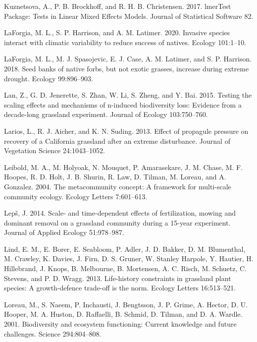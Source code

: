 \documentclass[twoside,12pt,final]{ucthesis-CA2012}
\newlength{\cslhangindent}
\newenvironment{cslreferences}%
  {\setlength{\parindent}{0pt}%
  \everypar{\setlength{\hangindent}{\cslhangindent}}\ignorespaces}%
  {\par}
\begin{document}
\begin{ucmainmatter}
\begin{cslreferences}
\leavevmode\hypertarget{ref-Kuznetsova2017}{}%
Kuznetsova, A., P. B. Brockhoff, and R. H. B. Christensen. 2017. lmerTest Package: Tests in Linear Mixed Effects Models. Journal of Statistical Software 82.

\leavevmode\hypertarget{ref-Laforgia2020}{}%
LaForgia, M. L., S. P. Harrison, and A. M. Latimer. 2020. Invasive species interact with climatic variability to reduce success of natives. Ecology 101:1--10.

\leavevmode\hypertarget{ref-Laforgia2018}{}%
LaForgia, M. L., M. J. Spasojevic, E. J. Case, A. M. Latimer, and S. P. Harrison. 2018. Seed banks of native forbs, but not exotic grasses, increase during extreme drought. Ecology 99:896--903.

\leavevmode\hypertarget{ref-lan2015}{}%
Lan, Z., G. D. Jenerette, S. Zhan, W. Li, S. Zheng, and Y. Bai. 2015. Testing the scaling effects and mechanisms of n-induced biodiversity loss: Evidence from a decade-long grassland experiment. Journal of Ecology 103:750--760.

\leavevmode\hypertarget{ref-Larios2013}{}%
Larios, L., R. J. Aicher, and K. N. Suding. 2013. Effect of propagule pressure on recovery of a California grassland after an extreme disturbance. Journal of Vegetation Science 24:1043--1052.

\leavevmode\hypertarget{ref-leibold2004}{}%
Leibold, M. A., M. Holyoak, N. Mouquet, P. Amarasekare, J. M. Chase, M. F. Hoopes, R. D. Holt, J. B. Shurin, R. Law, D. Tilman, M. Loreau, and A. Gonzalez. 2004. The metacommunity concept: A framework for multi-scale community ecology. Ecology Letters 7:601--613.

\leavevmode\hypertarget{ref-lep2014}{}%
Lepš, J. 2014. Scale- and time-dependent effects of fertilization, mowing and dominant removal on a grassland community during a 15-year experiment. Journal of Applied Ecology 51:978--987.

\leavevmode\hypertarget{ref-Lind2013}{}%
Lind, E. M., E. Borer, E. Seabloom, P. Adler, J. D. Bakker, D. M. Blumenthal, M. Crawley, K. Davies, J. Firn, D. S. Gruner, W. Stanley Harpole, Y. Hautier, H. Hillebrand, J. Knops, B. Melbourne, B. Mortensen, A. C. Risch, M. Schuetz, C. Stevens, and P. D. Wragg. 2013. Life-history constraints in grassland plant species: A growth-defence trade-off is the norm. Ecology Letters 16:513--521.

\leavevmode\hypertarget{ref-loreau2001}{}%
Loreau, M., S. Naeem, P. Inchausti, J. Bengtsson, J. P. Grime, A. Hector, D. U. Hooper, M. A. Huston, D. Raffaelli, B. Schmid, D. Tilman, and D. A. Wardle. 2001. Biodiversity and ecosystem functioning: Current knowledge and future challenges. Science 294:804--808.


\end{cslreferences}
\end{ucmainmatter}
\end{document}
